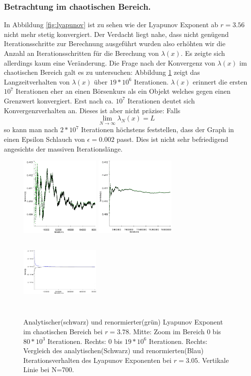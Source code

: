 \documentclass{scrartcl}
\begin{document}
\subsubsection{Betrachtung im chaotischen Bereich.}
In Abbildung \ref{fig:lyapunov} ist zu sehen wie der Lyapunov Exponent ab $r=3.56$ nicht mehr stetig konvergiert. 
Der Verdacht liegt nahe, dass nicht genügend Iterationsschritte zur Berechnung ausgeführt wurden also erhöhten wir die Anzahl an Iterationsschritten für die Berechung von $\lambda(x)$. Es zeigte sich allerdings kaum eine Veränderung. Die Frage nach der Konvergenz von $\lambda(x)$ im chaotischen Bereich galt es zu untersuchen: Abbildung \ref{fig:lyapunov-chaos} zeigt das Langzeitverhalten von $\lambda(x)$ über $19*10^6$ Iterationen. $\lambda(x)$ erinnert die ersten $10^7$ Iterationen eher an einen Börsenkurs als ein Objekt welches gegen einen Grenzwert konvergiert. Erst nach ca. $10^7$ Iterationen deutet sich Konvergenzverhalten an. Dieses ist aber nicht präzise: Falls 
\begin{equation}
\lim_{N \rightarrow \infty} \lambda_N(x) = L
\end{equation}
so kann man nach $2*10^7$ Iterationen höchstens feststellen, dass der Graph in einen Epsilon Schlauch von $\epsilon=0.002$ passt. Dies ist nicht sehr befriedigend angesichts der massiven Iterationslänge.  
 
\begin{figure}[!htbp]
\centering
\includegraphics[height=150px]{lya378-zoom}
\includegraphics[height=150px]{lya378}
\includegraphics[height=150px, width=150px]{lyapunov-analysis-305}
\caption{Analytischer(schwarz) und renormierter(grün) Lyapunov Exponent im chaotischen Bereich bei $r=3.78$. Mitte: Zoom im Bereich 0 bis $80*10^3$ Iterationen. Rechts:  0 bis $19*10^6$ Iterationen.
Rechts: Vergleich des analytischen(Schwarz) und renormierten(Blau) Iterationsverhalten des Lyapunov Exponenten bei $r=3.05$. Vertikale Linie bei N=700. }
\label{fig:lyapunov-chaos}
\end{figure}
\end{document}
